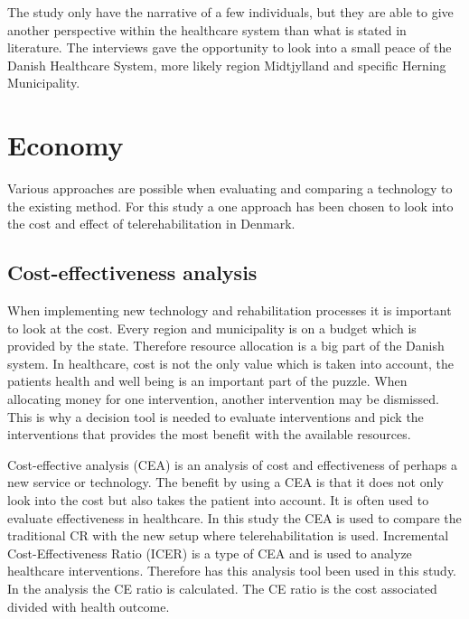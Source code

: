 The study only have the narrative of a few individuals, but they are able to give another perspective within the healthcare system than what is stated in literature. The interviews gave the opportunity to look into a small peace of the Danish Healthcare System, more likely region Midtjylland and specific Herning Municipality. 




\section{Economy}


Various approaches are possible when evaluating and comparing a technology to the existing method. For this study a one approach has been chosen to look into the cost and effect of telerehabilitation in Denmark.

\subsection{Cost-effectiveness analysis}

When implementing new technology and rehabilitation processes it is important to look at the cost. Every region and municipality is on a budget which is provided by the state. Therefore resource allocation is a big part of the Danish system. In healthcare, cost is not the only value which is taken into account, the patients health and well being is an important part of the puzzle. When allocating money for one intervention, another intervention may be dismissed. This is why a decision tool is needed to evaluate interventions and pick the interventions that provides the most benefit with the available resources.

Cost-effective analysis (CEA) is an analysis of cost and effectiveness of perhaps a new service or technology. The benefit by using a CEA is that it does not only look into the cost but also takes the patient into account. It is often used to evaluate effectiveness in healthcare. In this study the CEA is used to compare the traditional CR with the new setup where telerehabilitation is used. Incremental Cost-Effectiveness Ratio (ICER) is a type of CEA and is used to analyze healthcare interventions. Therefore has this analysis tool been used in this study. In the analysis the CE ratio is calculated. The CE ratio is the cost associated divided with health outcome.

